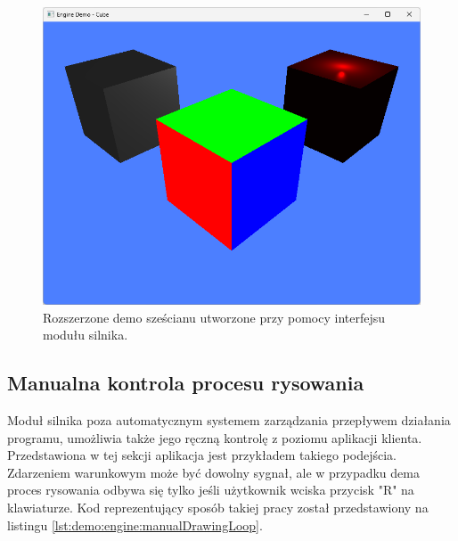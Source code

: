 \vfill

\begin{figure}[h!]
	\centering
	\includegraphics[width=\textwidth]{images/demo_engine_cube.png}
	\caption{Rozszerzone demo sześcianu utworzone przy pomocy interfejsu modułu silnika.}
	\label{demo_engine_cube}
\end{figure}

\subsection{Manualna kontrola procesu rysowania}
Moduł silnika poza automatycznym systemem zarządzania przepływem działania programu, umożliwia także jego ręczną kontrolę z poziomu aplikacji klienta. Przedstawiona w tej sekcji aplikacja jest przykładem takiego podejścia. Zdarzeniem warunkowym może być dowolny sygnał, ale w przypadku dema proces rysowania odbywa się tylko jeśli użytkownik wciska przycisk "R" na klawiaturze. Kod reprezentujący sposób takiej pracy został przedstawiony na listingu \ref{lst:demo:engine:manualDrawingLoop}.

\vfill
\clearpage

